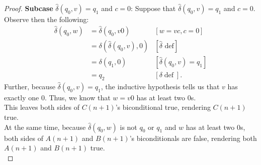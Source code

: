 \documentclass[10pt]{article}
\begin{document}
\begin{enumerate}[label={}]
\begin{proof}
                  \textbf{Subcase }$\hat{\delta}\left(q_0, v\right)=q_1$ and $c=0$: Suppose that $\hat{\delta}\left(q_0, v\right)=q_1$ and $c=0$. Observe then the following:
                  $$
                        \begin{aligned}
                              \hat{\delta}\left(q_0, w\right) & =\hat{\delta}\left(q_0, v 0\right)                    & {[w=v c, c=0] }                                     \\
                                                              & =\delta\left(\hat{\delta}\left(q_0, v\right),0\right) & {[\hat{\delta} \text { def}] }                      \\
                                                              & =\delta\left(q_1, 0\right)                            & {\left[\hat{\delta}\left(q_0, v\right)=q_1\right] } \\
                                                              & =q_2                                                  & {[\delta \operatorname{def}] . }
                        \end{aligned}
                  $$
                  Further, because $\hat{\delta}\left(q_0, v\right)=q_1$, the inductive hypothesis tells us that $v$ has exactly one 0. Thus, we know that $w=v0$ has at least two 0s.\\
                  This leaves both sides of $C(n+1)$'s biconditional true, rendering $C(n+1)$ true.\\
                  At the same time, because $\hat{\delta}\left(q_0, w\right)$ is not $q_0$ or $q_1$ and $w$ has at least two 0s, both sides of $A(n+1)$ and $B(n+1)$'s biconditionals are false, rendering both $A(n+1)$ and $B(n+1)$ true.\\


\end{proof}
\end{enumerate}
\end{document}
